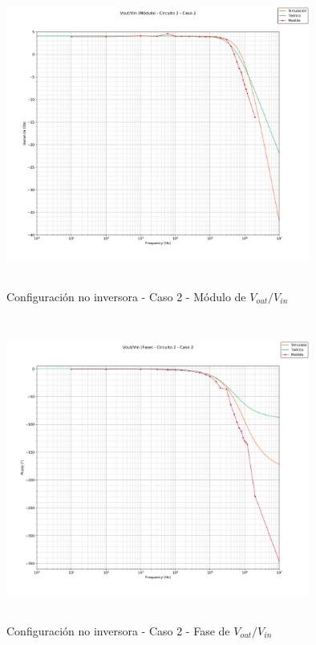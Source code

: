 \begin{figure}[H] %
	\centering
	\includegraphics[width=10cm,height=10cm,keepaspectratio]{../EJ1/00GRAFICOS/c2c2/c2c2voviMod.png}
	\caption{Configuración no inversora - Caso 2 - M\'odulo de $V_{out}/V_{in}$}
	\label{c2c2voviM}
\end{figure}

\begin{figure}[H] %
	\centering
	\includegraphics[width=10cm,height=10cm,keepaspectratio]{../EJ1/00GRAFICOS/c2c2/c2c2voviFASE.png}
	\caption{Configuración no inversora - Caso 2 - Fase de $V_{out}/V_{in}$}
	\label{c2c2voviP}
\end{figure}


